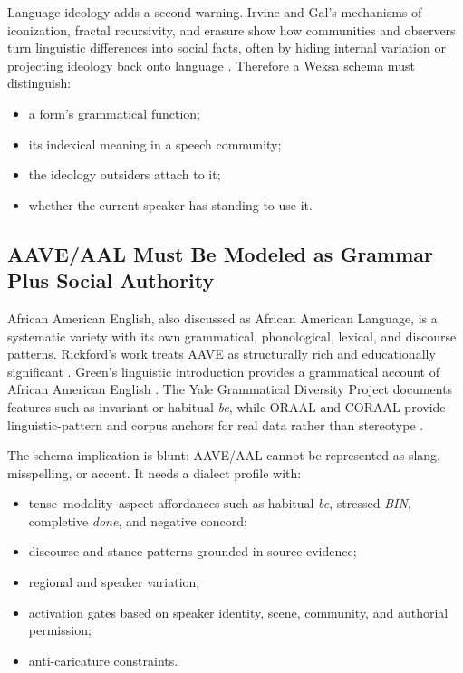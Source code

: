 \documentclass[11pt]{article}
\begin{document}
Language ideology adds a second warning. Irvine and Gal's mechanisms of
iconization, fractal recursivity, and erasure show how communities and observers
turn linguistic differences into social facts, often by hiding internal
variation or projecting ideology back onto language \cite{irvinegal2000}.
Therefore a Weksa schema must distinguish:

\begin{itemize}[noitemsep]
  \item a form's grammatical function;
  \item its indexical meaning in a speech community;
  \item the ideology outsiders attach to it;
  \item whether the current speaker has standing to use it.
\end{itemize}

\subsection{AAVE/AAL Must Be Modeled as Grammar Plus Social Authority}

African American English, also discussed as African American Language, is a
systematic variety with its own grammatical, phonological, lexical, and
discourse patterns. Rickford's work treats AAVE as structurally rich and
educationally significant \cite{rickford1999,rickford2016}. Green's linguistic
introduction provides a grammatical account of African American English
\cite{green2002}. The Yale Grammatical Diversity Project documents features
such as invariant or habitual \emph{be}, while ORAAL and CORAAL provide
linguistic-pattern and corpus anchors for real data rather than stereotype
\cite{yaleInvariantBe,oraalPatterns,coraal}.

The schema implication is blunt: AAVE/AAL cannot be represented as slang,
misspelling, or accent. It needs a dialect profile with:

\begin{itemize}[noitemsep]
  \item tense--modality--aspect affordances such as habitual \emph{be},
  stressed \emph{BIN}, completive \emph{done}, and negative concord;
  \item discourse and stance patterns grounded in source evidence;
  \item regional and speaker variation;
  \item activation gates based on speaker identity, scene, community, and
  authorial permission;
  \item anti-caricature constraints.
\end{itemize}
\end{document}

